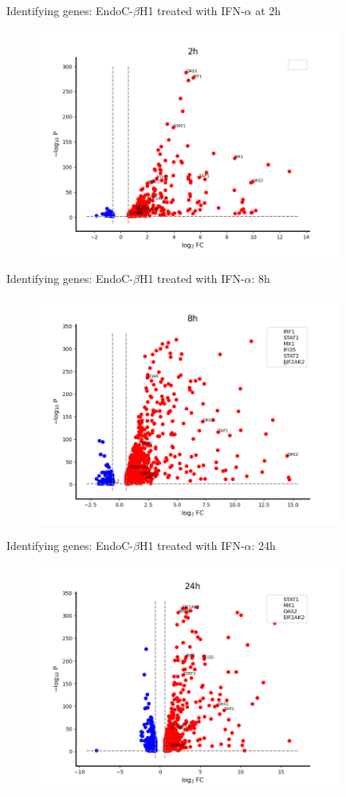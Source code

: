 \documentclass{beamer}					%
\begin{document}
\begin{frame}{Identifying genes: EndoC-$\beta$H1 treated with IFN-$\alpha$ at 2h }


\begin{figure}
\includegraphics[width=10cm]{volcano-2h.png}
\end{figure}

\end{frame}

\begin{frame}{Identifying genes: EndoC-$\beta$H1 treated with IFN-$\alpha$: 8h }

\begin{figure}
\includegraphics[width=10cm]{volcano-8h.png}
\end{figure}


\end{frame}

\begin{frame}{Identifying genes: EndoC-$\beta$H1 treated with IFN-$\alpha$: 24h }

\begin{figure}
\includegraphics[width=10cm]{volcano-24h.png}
\end{figure}


\end{frame}
\end{document}

